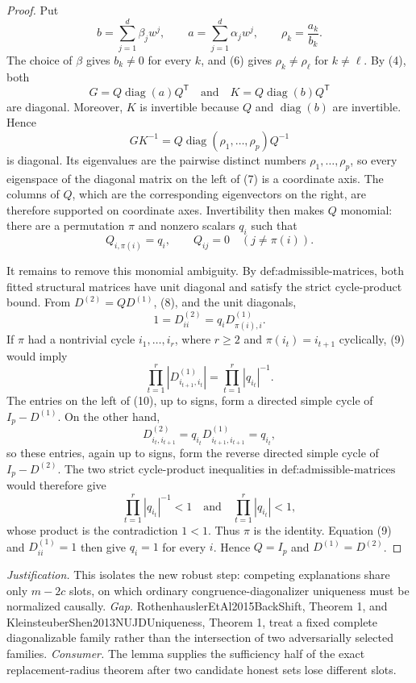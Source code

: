 \documentclass{article}
\begin{document}
\begin{proof}
Put
\[
 b=\sum_{j=1}^d\beta_jw^j,
 \qquad
 a=\sum_{j=1}^d\alpha_jw^j,
 \qquad
 \rho_k=\frac{a_k}{b_k}.
\]
The choice of \(\beta\) gives \(b_k\ne0\) for every \(k\), and (6) gives \(\rho_k\ne\rho_\ell\) for \(k\ne\ell\).  By (4), both
\[
 G=Q\operatorname{diag}(a)Q^{\mathsf T}
 \quad\text{and}\quad
 K=Q\operatorname{diag}(b)Q^{\mathsf T}
\]
are diagonal.  Moreover, \(K\) is invertible because \(Q\) and \(\operatorname{diag}(b)\) are invertible.  Hence
\[
 GK^{-1}
 =Q\operatorname{diag}(\rho_1,\ldots,\rho_p)Q^{-1}
 \tag{7}
\]
is diagonal.  Its eigenvalues are the pairwise distinct numbers \(\rho_1,\ldots,\rho_p\), so every eigenspace of the diagonal matrix on the left of (7) is a coordinate axis.  The columns of \(Q\), which are the corresponding eigenvectors on the right, are therefore supported on coordinate axes.  Invertibility then makes \(Q\) monomial: there are a permutation \(\pi\) and nonzero scalars \(q_i\) such that
\[
 Q_{i,\pi(i)}=q_i,
 \qquad Q_{ij}=0\quad(j\ne\pi(i)).
 \tag{8}
\]

It remains to remove this monomial ambiguity.  By \(\text{def:admissible-matrices}\), both fitted structural matrices have unit diagonal and satisfy the strict cycle-product bound.  From \(D^{(2)}=QD^{(1)}\), (8), and the unit diagonals,
\[
 1=D^{(2)}_{ii}=q_iD^{(1)}_{\pi(i),i}.
 \tag{9}
\]
If \(\pi\) had a nontrivial cycle \(i_1,\ldots,i_r\), where \(r\ge2\) and \(\pi(i_t)=i_{t+1}\) cyclically, (9) would imply
\[
 \prod_{t=1}^r\left|D^{(1)}_{i_{t+1},i_t}\right|
 =\prod_{t=1}^r|q_{i_t}|^{-1}.
 \tag{10}
\]
The entries on the left of (10), up to signs, form a directed simple cycle of \(I_p-D^{(1)}\).  On the other hand,
\[
 D^{(2)}_{i_t,i_{t+1}}
 =q_{i_t}D^{(1)}_{i_{t+1},i_{t+1}}=q_{i_t},
\]
so these entries, again up to signs, form the reverse directed simple cycle of \(I_p-D^{(2)}\).  The two strict cycle-product inequalities in \(\text{def:admissible-matrices}\) would therefore give
\[
 \prod_{t=1}^r|q_{i_t}|^{-1}<1
 \quad\text{and}\quad
 \prod_{t=1}^r|q_{i_t}|<1,
\]
whose product is the contradiction \(1<1\).  Thus \(\pi\) is the identity.  Equation (9) and \(D^{(1)}_{ii}=1\) then give \(q_i=1\) for every \(i\).  Hence \(Q=I_p\) and \(D^{(1)}=D^{(2)}\).
\end{proof}
\par\smallskip\noindent \textit{Justification.} This isolates the new robust step: competing explanations share only \(m-2c\) slots, on which ordinary congruence-diagonalizer uniqueness must be normalized causally. \textit{Gap.} RothenhauslerEtAl2015BackShift, Theorem 1, and KleinsteuberShen2013NUJDUniqueness, Theorem 1, treat a fixed complete diagonalizable family rather than the intersection of two adversarially selected families. \textit{Consumer.} The lemma supplies the sufficiency half of the exact replacement-radius theorem after two candidate honest sets lose different slots.
\end{document}
